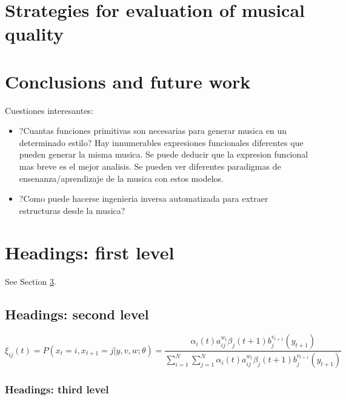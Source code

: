 \documentclass{article}
\begin{document}


\section{Strategies for evaluation of musical quality}





\section{Conclusions and future work}

Cuestiones interesantes: 
\begin{itemize}
\item ?Cuantas funciones primitivas son necesarias para generar musica en un determinado estilo? Hay innumerables expresiones funcionales diferentes que pueden generar la misma musica. Se puede deducir que la expresion funcional mas breve es el mejor analisis. Se pueden ver diferentes paradigmas de ensenanza/aprendizaje de la musica con estos modelos.
\item ?Como puede hacerse ingenieria inversa automatizada para extraer estructuras desde la musica?
\end{itemize}


\section{Headings: first level}
\label{sec:headings}

\lipsum[4] See Section \ref{sec:headings}.

\subsection{Headings: second level}
\lipsum[5]
\begin{equation}
\xi _{ij}(t)=P(x_{t}=i,x_{t+1}=j|y,v,w;\theta)= {\frac {\alpha _{i}(t)a^{w_t}_{ij}\beta _{j}(t+1)b^{v_{t+1}}_{j}(y_{t+1})}{\sum _{i=1}^{N} \sum _{j=1}^{N} \alpha _{i}(t)a^{w_t}_{ij}\beta _{j}(t+1)b^{v_{t+1}}_{j}(y_{t+1})}}
\end{equation}

\subsubsection{Headings: third level}
\lipsum[6]
\end{document}
